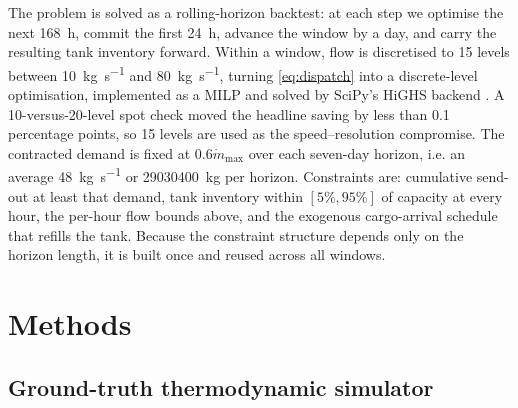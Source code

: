 \documentclass[11pt]{article}
\begin{document}
The problem is solved as a rolling-horizon backtest: at each step we
optimise the next \SI{168}{\hour}, commit the first \SI{24}{\hour}, advance
the window by a day, and carry the resulting tank inventory forward.
Within a window, flow is discretised to 15 levels between
\SI{10}{\kilo\gram\per\second} and \SI{80}{\kilo\gram\per\second}, turning
\cref{eq:dispatch} into a discrete-level optimisation, implemented as a MILP
and solved by SciPy's HiGHS backend \citep{virtanen2020scipy,huangfu2018simplex}.
A 10-versus-20-level spot check moved the
headline saving by less than 0.1 percentage points, so 15 levels are used as
the speed--resolution compromise. The contracted demand is fixed at
$0.6\dot m_{\max}$ over each seven-day horizon, i.e. an average
\SI{48}{\kilo\gram\per\second} or \SI{29030400}{\kilo\gram} per horizon.
Constraints are: cumulative send-out at least that demand, tank inventory within
$[5\%, 95\%]$ of capacity at every hour, the per-hour flow bounds above, and
the exogenous cargo-arrival schedule that refills the tank. Because the
constraint structure depends only on the horizon length, it is built once
and reused across all windows.

\section{Methods}
\label{sec:methods}

\subsection{Ground-truth thermodynamic simulator}
\end{document}
